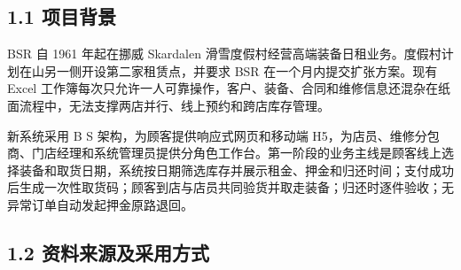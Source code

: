 \FloatBarrier
{}\label{ux7b2c-1-ux7ae0-ux7ebfux4e0aux8c03ux7814}

\subsection{1.1 项目背景}

BSR 自 1961 年起在挪威 Skardalen 滑雪度假村经营高端装备日租业务。度假村计划在山另一侧开设第二家租赁点，并要求 BSR 在一个月内提交扩张方案。现有 Excel 工作簿每次只允许一人可靠操作，客户、装备、合同和维修信息还混杂在纸面流程中，无法支撑两店并行、线上预约和跨店库存管理。

新系统采用 B S 架构，为顾客提供响应式网页和移动端 H5，为店员、维修分包商、门店经理和系统管理员提供分角色工作台。第一阶段的业务主线是顾客线上选择装备和取货日期，系统按日期筛选库存并展示租金、押金和归还时间；支付成功后生成一次性取货码；顾客到店与店员共同验货并取走装备；归还时逐件验收；无异常订单自动发起押金原路退回。

\subsection{1.2 资料来源及采用方式}

